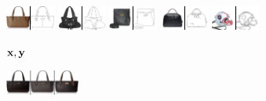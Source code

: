   \clearpage
\newcommand{\edgesstuffimgheight}{0.8cm}
  \begin{figure}[t]
    \centering
    \begin{subfigure}[t]{0.15\textwidth}
      \centering
      \includegraphics[height=\edgesstuffimgheight]{figs/cigcvae/image-samples/bags/image_aipo_0_imagenet_gt_masked.png}
      \includegraphics[height=\edgesstuffimgheight]{figs/cigcvae/image-samples/bags/image_aipo_1_imagenet_gt_masked.png}
      \includegraphics[height=\edgesstuffimgheight]{figs/cigcvae/image-samples/bags/image_aipo_2_imagenet_gt_masked.png}
      \includegraphics[height=\edgesstuffimgheight]{figs/cigcvae/image-samples/bags/image_aipo_3_imagenet_gt_masked.png}
      \includegraphics[height=\edgesstuffimgheight]{figs/cigcvae/image-samples/bags/image_aipo_4_imagenet_gt_masked.png}
      \caption{\scriptsize ${\mathbf{x}}, {\mathbf{y}}$}
    \end{subfigure}
    \begin{subfigure}[t]{0.27\textwidth}
      \centering
      \includegraphics[height=\edgesstuffimgheight]{figs/cigcvae/image-samples/bags/image_aipo_0_t=0.85_imagenet_samples.png}

\end{subfigure}
\end{figure}
